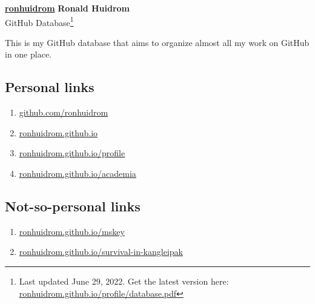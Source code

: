 \documentclass{article}
\begin{document}

\begin{center}
  \Large  \href{https://github.com/ronhuidrom}{\textbf{ronhuidrom}} \hspace*{8pt}\textbf{Ronald Huidrom}\\
  \vspace*{1mm}
  \large GitHub Database\footnote{Last updated June 29, 2022. Get the latest version here: \href{https://}{ronhuidrom.github.io/profile/database.pdf}}
\end{center}


\normalsize
This is my GitHub database that aims to organize almost all my work on GitHub in one place.

\subsection*{Personal links}

\begin{enumerate}
\item \href{https://github.com/ronhuidrom}{github.com/ronhuidrom}
\item \href{https://ronhuidrom.github.io}{ronhuidrom.github.io} 
\item \href{https://ronhuidrom.github.io/profile}{ronhuidrom.github.io/profile} 
\item \href{https://ronhuidrom.github.io/academia}{ronhuidrom.github.io/academia}
\end{enumerate}

\subsection*{Not-so-personal links}

\begin{enumerate}[resume]
\item \href{https://ronhuidrom.github.io/mskey}{ronhuidrom.github.io/mskey} 
\item \href{https://ronhuidrom.github.io/survival-in-kangleipak}{ronhuidrom.github.io/survival-in-kangleipak}
\end{enumerate}
\end{document}
